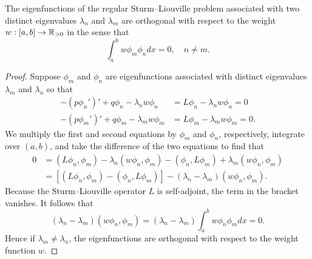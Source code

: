 \begin{theorem}
    The eigenfunctions of the regular Sturm--Liouville problem associated with two distinct eigenvalues $\lambda_n$ and $\lambda_m$ are orthogonal with respect to the weight $w : [a, b] \to \mathbb{R}_{>0}$ in the sense that
    \[\int_a^b w \phi_m \phi_n dx = 0, \quad n \neq m.\]
\end{theorem}
\begin{proof}
    Suppose $\phi_m$ and $\phi_n$ are eigenfunctions associated with distinct eigenvalues $\lambda_m$ and $\lambda_n$ so that
    \begin{align*}
        -(p\phi_n')' + q\phi_n - \lambda_n w \phi_n &= L\phi_n - \lambda_n w \phi_n = 0 \\
        -(p\phi_m')' + q\phi_m - \lambda_m w \phi_m &= L\phi_m - \lambda_m w \phi_m = 0.
    \end{align*}
    We multiply the first and second equations by $\phi_m$ and $\phi_n$, respectively, integrate over $(a, b)$, and take the difference of the two equations to find that
    \begin{align*}
        0 &= (L\phi_n, \phi_m) - \lambda_n (w\phi_n, \phi_m) - (\phi_n, L\phi_m) + \lambda_m (w\phi_n, \phi_m) \\
        &= [(L\phi_n, \phi_m) - (\phi_n, L\phi_m)] - (\lambda_n - \lambda_m)(w\phi_n, \phi_m).
    \end{align*}
    Because the Sturm--Liouville operator $L$ is self-adjoint, the term in the bracket vanishes. It follows that
    \[(\lambda_n - \lambda_m)(w\phi_n, \phi_m) = (\lambda_n - \lambda_m) \int_a^b w \phi_n \phi_m dx = 0.\]
    Hence if $\lambda_m \neq \lambda_n$, the eigenfunctions are orthogonal with respect to the weight function $w$.
\end{proof}


